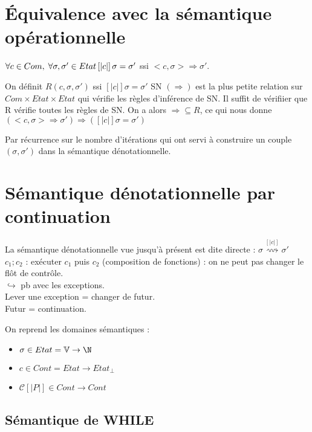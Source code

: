 \documentclass[10pt,a4paper]{article}
\newcommand{\semm}[1]{\left[| #1 | \right]}
\newcommand{\V}{\mathbb{V}}
\begin{document}
\section{Équivalence avec la sémantique opérationnelle}
\begin{thm} $\forall c \in Com, \; \forall \sigma, \sigma' \in Etat\\
\semm{c} \sigma = \sigma'$ ssi $<c, \sigma> \Rightarrow \sigma'$.\\
\end{thm}

\begin{dem}[Winskel] \fbox{$\Leftarrow$} On définit $R(c, \sigma, \sigma')$ ssi $\semm{c} \sigma = \sigma'$
SN $(\Rightarrow)$ est la plus petite relation sur $Com \times Etat \times Etat$ qui vérifie les règles d'inférence de SN.
Il suffit de vérifiier que R vérifie toutes les règles de SN.
On a alors $\Rightarrow \subseteq R$, ce qui nous donne $(<c, \sigma> \Rightarrow \sigma') \Longrightarrow (\semm{c} \sigma = \sigma')$


\fbox{$\Rightarrow$} Par récurrence sur le nombre d'itérations qui ont servi à construire un couple $(\sigma, \sigma')$ dans la sémantique dénotationnelle.
\end{dem}


\section{Sémantique dénotationnelle par continuation}

La sémantique dénotationnelle vue jusqu'à présent est dite directe : $ \sigma \stackrel{\semm{c}}{\rightsquigarrow} \sigma'$\\
$c_1;c_2$ : exécuter $c_1$ puis $c_2$ (composition de fonctions) : on ne peut pas changer le flôt de contrôle.\\
$\hookrightarrow $ pb avec les exceptions.\\
Lever une exception = changer de futur.\\
Futur = continuation.

On reprend les domaines sémantiques : 
\begin{itemize}
 \item $\sigma \in Etat = \V \to \N$
 \item $c \in Cont = Etat \to Etat_{\perp}$
 \item $\mathcal{C} \semm{P} \in Cont \to Cont$
\end{itemize}

\subsection{Sémantique de WHILE}
\end{document}
